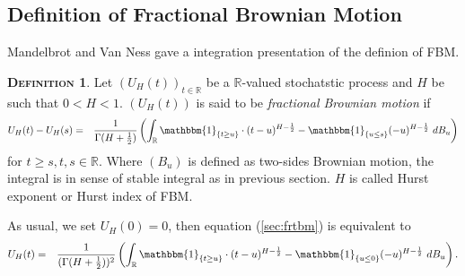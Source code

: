 \documentclass[a4paper, twoside, 11pt]{article}
\theoremstyle{definition}
\newtheorem{definition}{\scshape Definition}[section]
\newcommand{\brkt}[1]{\left({#1} \right)}
\begin{document}
\subsection{Definition of Fractional Brownian Motion}
Mandelbrot and Van Ness \cite{mandelbrot} gave a integration presentation of the definion of FBM.
\begin{definition}
  Let $(U_H(t))_{t\in \mathbb{R}}$ be a $\mathbb{R}$-valued stochatstic process and $H$ be such that $0<H<1$. $(U_H(t))$ is said to be \emph{fractional Brownian motion} if 
  \begin{eqnarray}
	U_H(t) - U_H(s) &=& \frac{1}{\Gamma(H+\frac{1}{2})}\brkt{\int_{\mathbb{R}} \mathbbm{1}_{\{t\ge u\}}\cdot (t-u)^{H-\frac{1}{2}} - \mathbbm{1}_{\{u\le s\}} (-u)^{H-\frac{1}{2}} \, \mathop{dB_u}}
	\label{sec:frtbm}
  \end{eqnarray}
  for $t\ge s, t, s \in \mathbb{R}$. Where $(B_u)$ is defined as two-sides Brownian motion, the integral is in sense of stable integral as in previous section. $H$ is called Hurst exponent or Hurst index of FBM.
\end{definition}

As usual, we set $U_H(0) = 0$, then equation (\ref{sec:frtbm}) is equivalent to
	 \begin{eqnarray}
	   U_H(t) &=& \frac{1}{(\Gamma(H+\frac{1}{2}))^2}\brkt{\int_{\mathbb{R}} \mathbbm{1}_{\{t\ge u\}}\cdot (t-u)^{H-\frac{1}{2}} - \mathbbm{1}_{\{u\le 0\}} (-u)^{H-\frac{1}{2}} \, \mathop{dB_u}}.
	\label{sec:fbm}
  \end{eqnarray}
\end{document}
